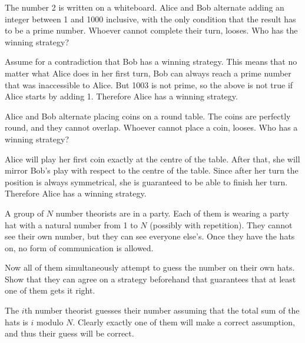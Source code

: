 \begin{problem}
        \begin{statement}
		The number 2 is written on a whiteboard. Alice and Bob alternate adding an integer between 1 and 1000 inclusive, with the only condition that the result has to be a prime number. Whoever cannot complete their turn, looses. Who has the winning strategy?
        \end{statement}
	\begin{solution}
	        Assume for a contradiction that Bob has a winning strategy.
		This means that no matter what Alice does in her first turn, Bob can always reach a prime number that was inaccessible to Alice. But 1003 is not prime, so the above is not true if Alice starts by adding 1. Therefore Alice has a winning strategy.
	\end{solution}
\end{problem}


\begin{problem}
        \begin{statement}
                Alice and Bob alternate placing coins on a round table. The coins are perfectly round, and they cannot overlap. Whoever cannot place a coin, looses. Who has a winning strategy?
        \end{statement}
	\begin{solution}
	        Alice will play her first coin exactly at the centre of the table. After that, she will mirror Bob's play with respect to the centre of the table. Since after her turn the position is always symmetrical, she is guaranteed to be able to finish her turn. Therefore Alice has a winning strategy.
	\end{solution}
\end{problem}

\begin{problem}
        \begin{statement}
                A group of $N$ number theorists are in a party. Each of them is wearing a party hat with a natural number from 1 to $N$ (possibly with repetition). They cannot see their own number, but they can see everyone else's. Once they have the hats on, no form of communication is allowed.

		Now all of them simultaneously attempt to guess the number on their own hats. Show that they can agree on a strategy beforehand that guarantees that at least one of them gets it right.
        \end{statement}
	\begin{solution}
	        The $i$th number theorist guesses their number assuming that the total sum of the hats is $i$ modulo $N$. Clearly exactly one of them will make a correct assumption, and thus their guess will be correct.
	\end{solution}
\end{problem}

